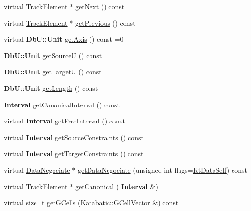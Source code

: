 \begin{DoxyCompactItemize}
\item 
virtual \mbox{\hyperlink{classKite_1_1TrackElement}{Track\+Element}} $\ast$ \mbox{\hyperlink{classKite_1_1TrackElement_a010b7fc8801c5b88aefa4137cf85186d}{get\+Next}} () const
\item 
virtual \mbox{\hyperlink{classKite_1_1TrackElement}{Track\+Element}} $\ast$ \mbox{\hyperlink{classKite_1_1TrackElement_a55d6115d84c11ad147f4c38fe372ea24}{get\+Previous}} () const
\item 
virtual \textbf{ Db\+U\+::\+Unit} \mbox{\hyperlink{classKite_1_1TrackElement_ac492fb5399691d81c31547db6b56fd03}{get\+Axis}} () const =0
\item 
\textbf{ Db\+U\+::\+Unit} \mbox{\hyperlink{classKite_1_1TrackElement_ad521ffba761b0e81b7b81b99d62f76f9}{get\+SourceU}} () const
\item 
\textbf{ Db\+U\+::\+Unit} \mbox{\hyperlink{classKite_1_1TrackElement_a4d52a506cd19dfa8e22e1dc0695bd960}{get\+TargetU}} () const
\item 
\textbf{ Db\+U\+::\+Unit} \mbox{\hyperlink{classKite_1_1TrackElement_ab1ca7adfc68761c749a16f65c9aa4088}{get\+Length}} () const
\item 
\textbf{ Interval} \mbox{\hyperlink{classKite_1_1TrackElement_ae96c050b96eaea51a3821cc01a1f3334}{get\+Canonical\+Interval}} () const
\item 
virtual \textbf{ Interval} \mbox{\hyperlink{classKite_1_1TrackElement_a034711e2d3617ea848ef9f5a18255e10}{get\+Free\+Interval}} () const
\item 
virtual \textbf{ Interval} \mbox{\hyperlink{classKite_1_1TrackElement_a48f8b54f9489da3778d85c382a483f81}{get\+Source\+Constraints}} () const
\item 
virtual \textbf{ Interval} \mbox{\hyperlink{classKite_1_1TrackElement_a69af7d4287bc0e44c9ca2c8e6f692be9}{get\+Target\+Constraints}} () const
\item 
virtual \mbox{\hyperlink{classKite_1_1DataNegociate}{Data\+Negociate}} $\ast$ \mbox{\hyperlink{classKite_1_1TrackElement_acd0170a05128ec4af16ecd0060c3a3b5}{get\+Data\+Negociate}} (unsigned int flags=\mbox{\hyperlink{namespaceKite_acca8fffa3182dea5f94208f454f14b47a68e917ff37d4b5cef906303181836404}{Kt\+Data\+Self}}) const
\item 
virtual \mbox{\hyperlink{classKite_1_1TrackElement}{Track\+Element}} $\ast$ \mbox{\hyperlink{classKite_1_1TrackElement_af2d46d64cbd02bdbba53d5483d95e26d}{get\+Canonical}} (\textbf{ Interval} \&)
\item 
virtual size\+\_\+t \mbox{\hyperlink{classKite_1_1TrackElement_af45301f76558f613ccb605a8f851080e}{get\+G\+Cells}} (Katabatic\+::\+G\+Cell\+Vector \&) const

\end{DoxyCompactItemize}

